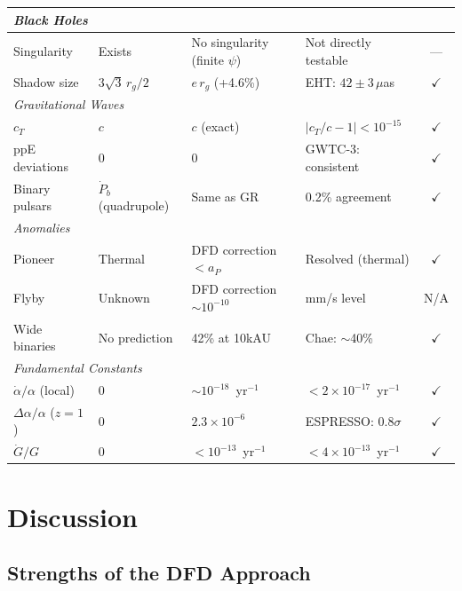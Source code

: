 \documentclass[aps,prd,twocolumn,superscriptaddress,nofootinbib]{revtex4-2}
\begin{document}
\begin{table}[t]
\begin{tabular}{p{3.5cm}p{3.5cm}p{3.5cm}p{3.5cm}c}
\midrule
\multicolumn{5}{l}{\textit{Black Holes}} \\
\midrule
Singularity & Exists & No singularity (finite $\psi$)
  & Not directly testable & --- \\
Shadow size & $3\sqrt{3}\,r_g/2$ & $e\,r_g$ (+4.6\%)
  & EHT: $42 \pm 3\,\mu$as & $\checkmark$ \\
\midrule
\multicolumn{5}{l}{\textit{Gravitational Waves}} \\
\midrule
$c_T$ & $c$ & $c$ (exact)
  & $|c_T/c - 1| < 10^{-15}$ & $\checkmark$ \\
ppE deviations & 0 & 0
  & GWTC-3: consistent & $\checkmark$ \\
Binary pulsars & $\dot{P}_b$ (quadrupole) & Same as GR
  & 0.2\% agreement & $\checkmark$ \\
\midrule
\multicolumn{5}{l}{\textit{Anomalies}} \\
\midrule
Pioneer & Thermal & DFD correction $< a_P$
  & Resolved (thermal) & $\checkmark$ \\
Flyby & Unknown & DFD correction $\sim 10^{-10}$
  & mm/s level & N/A \\
Wide binaries & No prediction & 42\% at 10kAU
  & Chae: $\sim$40\% & $\checkmark$ \\
\midrule
\multicolumn{5}{l}{\textit{Fundamental Constants}} \\
\midrule
$\dot\alpha/\alpha$ (local) & 0 & $\sim 10^{-18}$~yr$^{-1}$
  & $< 2\times10^{-17}$~yr$^{-1}$ & $\checkmark$ \\
$\Delta\alpha/\alpha$ ($z=1$) & 0 & $2.3\times10^{-6}$
  & ESPRESSO: $0.8\sigma$ & $\checkmark$ \\
$\dot{G}/G$ & 0 & $< 10^{-13}$~yr$^{-1}$
  & $< 4\times10^{-13}$~yr$^{-1}$ & $\checkmark$ \\
\bottomrule
\end{tabular}
\end{table}

\section{Discussion}\label{sec:discussion}

\subsection{Strengths of the DFD Approach}
\end{document}
